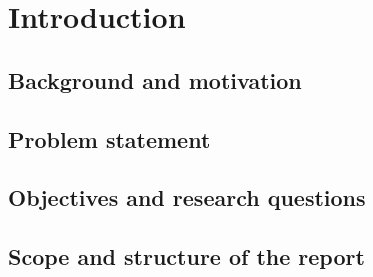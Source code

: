 \chapter{Introduction}\label{ch:introduction}

\section{Background and motivation}\label{sec:background}

\section{Problem statement}\label{sec:problem}

\section{Objectives and research questions}\label{sec:objectives}

\section{Scope and structure of the report}\label{sec:scope}

